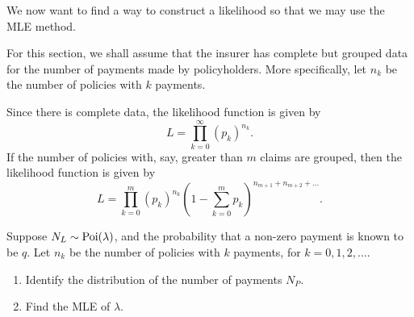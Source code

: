 \documentclass[notoc,notitlepage]{tufte-book}
\begin{document}
We now want to find a way to construct a likelihood so that we may use
the MLE method.

For this section, we shall assume that the insurer has complete but grouped
data for the number of payments made by policyholders.
More specifically, let $n_k$ be the number of policies with $k$ payments.

Since there is complete data, the likelihood function is given by
\begin{equation*}
  L = \prod_{k=0}^{\infty} (p_k)^{n_k}.
\end{equation*}
If the number of policies with, say, greater than $m$ claims are grouped,
then the likelihood function is given by
\begin{equation*}
  L = \prod_{k=0}^{m} (p_k)^{n_k} \left( 1 - \sum_{k=0}^{m} p_k \right)^{n_{m+1}
  + n_{m+2} + \hdots}.
\end{equation*}

\begin{eg}
  Suppose $N_L \sim \operatorname{Poi}(\lambda)$, and
  the probability that a non-zero payment is known to be $q$.
  Let $n_k$ be the number of policies with $k$ payments,
  for $k = 0, 1, 2, \ldots$.
  \begin{enumerate}
    \item Identify the distribution of the number of payments $N_P$.
    \item Find the MLE of $\lambda$.
  \end{enumerate}
\end{eg}
\end{document}
